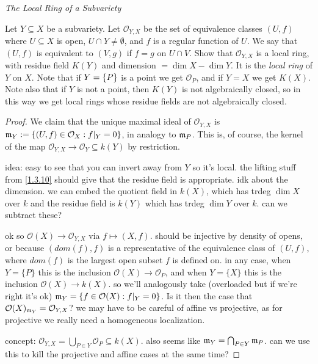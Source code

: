 \label{1.3.13}

\emph{The Local Ring of a Subvariety}

Let $Y \subseteq X$ be a subvariety. Let $\mathcal O_{Y, X}$ be the set of equivalence classes $(U, f)$ where $U \subseteq X$ is open, $U \cap Y \neq \emptyset$, and $f$ is a regular function of $U$. We say that $(U, f)$ is equivalent to $(V, g)$ if $f = g$ on $U \cap V$. Show that $\mathcal O_{Y, X}$ is a local ring, with residue field $K(Y)$ and dimension $= \dim X - \dim Y$. It is the \emph{local ring} of $Y$ on $X$. Note that if $Y = {\left\{P\right\}}$ is a point we get $\mathcal O_P$, and if $Y = X$ we get $K(X)$. Note also that if $Y$ is not a point, then $K(Y)$ is not algebraically closed, so in this way we get local rings whose residue fields are not algebraically closed.

\begin{proof}
    We claim that the unique maximal ideal of $\mathcal O_{Y, X}$ is $\mathfrak m_{Y} := {\left\{(U, f) \in \mathcal O_X : f|_{Y} = 0\right\}}$, in analogy to $\mathfrak m_P$. This is, of course, the kernel of the map $\mathcal O_{Y, X} \longrightarrow \mathcal O_Y \subseteq k(Y)$ by restriction.

    idea: easy to see that you can invert away from $Y$ so it's local. the lifting stuff from \ref{1.3.10} should give that the residue field is appropriate. idk about the dimension. we can embed the quotient field in $k(X)$, which has trdeg $\dim X$ over $k$ and the residue field is $k(Y)$ which has trdeg $\dim Y$ over $k$. can we subtract these?

    ok so $\mathcal O(X) \longrightarrow \mathcal O_{Y, X}$ via $f \mapsto (X, f)$. should be injective by density of opens, or because $(dom(f), f)$ is a representative of the equivalence class of $(U, f)$, where $dom(f)$ is the largest open subset $f$ is defined on. in any case, when $Y = \{P\}$ this is the inclusion $\mathcal O(X) \longrightarrow \mathcal O_P$, and when $Y = \{X\}$ this is the inclusion $\mathcal O(X) \longrightarrow k(X)$. so we'll analogously take (overloaded but if we're right it's ok) $\mathfrak m_Y = \{f \in \mathcal O(X) : f|_Y = 0\}$. Is it then the case that $\mathcal O(X)_{\mathfrak m_Y} = \mathcal O_{Y,X}$? we may have to be careful of affine vs projective, as for projective we really need a homogeneous localization.

    concept: $\mathcal O_{Y,X} = \bigcup_{P \in Y} \mathcal O_P \subseteq k(X)$. also seems like $\mathfrak m_Y = \bigcap_{P \in Y} \mathfrak m_P$. can we use this to kill the projective and affine cases at the same time?
\end{proof}
